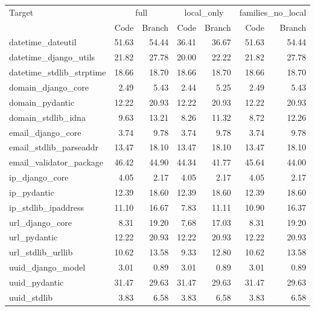 \begin{tabular}{lrrrrrr}
\toprule
Target & \multicolumn{2}{c}{full} & \multicolumn{2}{c}{local\_only} & \multicolumn{2}{c}{families\_no\_local} \\
 & Code & Branch & Code & Branch & Code & Branch \\
\midrule
datetime\_dateutil & 51.63 & 54.44 & 36.41 & 36.67 & 51.63 & 54.44 \\
datetime\_django\_utils & 21.82 & 27.78 & 20.00 & 22.22 & 21.82 & 27.78 \\
datetime\_stdlib\_strptime & 18.66 & 18.70 & 18.66 & 18.70 & 18.66 & 18.70 \\
domain\_django\_core & 2.49 & 5.43 & 2.44 & 5.25 & 2.49 & 5.43 \\
domain\_pydantic & 12.22 & 20.93 & 12.22 & 20.93 & 12.22 & 20.93 \\
domain\_stdlib\_idna & 9.63 & 13.21 & 8.26 & 11.32 & 8.72 & 12.26 \\
email\_django\_core & 3.74 & 9.78 & 3.74 & 9.78 & 3.74 & 9.78 \\
email\_stdlib\_parseaddr & 13.47 & 18.10 & 13.47 & 18.10 & 13.47 & 18.10 \\
email\_validator\_package & 46.42 & 44.90 & 44.34 & 41.77 & 45.64 & 44.00 \\
ip\_django\_core & 4.05 & 2.17 & 4.05 & 2.17 & 4.05 & 2.17 \\
ip\_pydantic & 12.39 & 18.60 & 12.39 & 18.60 & 12.39 & 18.60 \\
ip\_stdlib\_ipaddress & 11.10 & 16.67 & 7.83 & 11.11 & 10.90 & 16.37 \\
url\_django\_core & 8.31 & 19.20 & 7.68 & 17.03 & 8.31 & 19.20 \\
url\_pydantic & 12.22 & 20.93 & 12.22 & 20.93 & 12.22 & 20.93 \\
url\_stdlib\_urllib & 10.62 & 13.58 & 9.33 & 12.80 & 10.62 & 13.58 \\
uuid\_django\_model & 3.01 & 0.89 & 3.01 & 0.89 & 3.01 & 0.89 \\
uuid\_pydantic & 31.47 & 29.63 & 31.47 & 29.63 & 31.47 & 29.63 \\
uuid\_stdlib & 3.83 & 6.58 & 3.83 & 6.58 & 3.83 & 6.58 \\
\bottomrule
\end{tabular}

